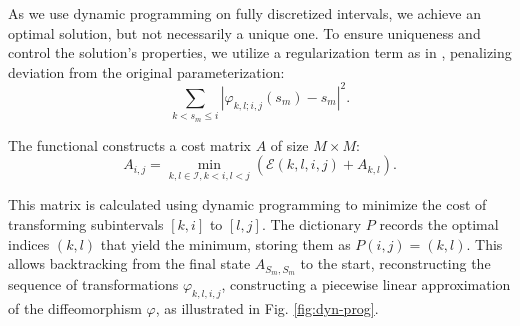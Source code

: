 As we use dynamic programming on fully discretized intervals, we achieve an optimal solution, but not necessarily a unique one. To ensure uniqueness and control the solution's properties, we utilize a regularization term as in \cite{bauerLandmarkGuidedElasticShape2015}, penalizing deviation from the original parameterization:
\begin{equation}
    \sum_{k < s_m \leq i} \left| \varphi_{k,l;i,j}(s_m) - s_m \right|^2.
    \label{eq:reg-perturbation}
\end{equation}

The functional constructs a cost matrix \(A\) of size \(M \times M\):
\begin{equation}
    A_{i,j} = \min_{k, l \in \mathcal{I}, k < i, l < j} \left( \mathcal{E}(k, l, i, j) + A_{k,l} \right).
    \label{eq:cost-matrix}
\end{equation}

This matrix is calculated using dynamic programming to minimize the cost of transforming subintervals \([k, i]\) to \([l, j]\). The dictionary \(P\) records the optimal indices \((k, l)\) that yield the minimum, storing them as \(P(i, j) = (k, l)\). This allows backtracking from the final state \(A_{S_m, S_m}\) to the start, reconstructing the sequence of transformations \(\varphi_{k, l, i, j}\), constructing a piecewise linear approximation of the diffeomorphism \(\varphi\), as illustrated in Fig. \ref{fig:dyn-prog}.

